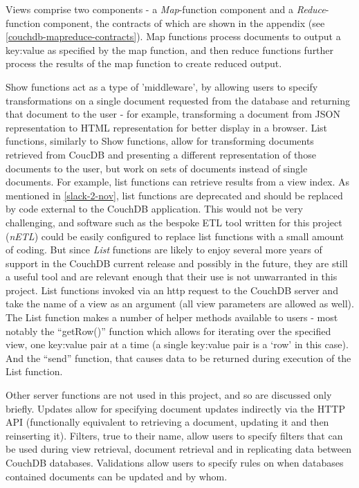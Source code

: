 Views comprise two components - a \textit{Map}-function component and a \textit{Reduce}-function component, the contracts of which are shown in the appendix (see \ref{couchdb-mapreduce-contracts}). Map functions process documents to output a key:value as specified by the map function, and then reduce functions further process the results of the map function to create reduced output.

Show functions act as a type of 'middleware', by allowing users to specify transformations on a single document requested from the database and returning that document to the user - for example, transforming a document from JSON representation to HTML representation for better display in a browser. List functions, similarly to Show functions, allow for transforming documents retrieved from CoucDB and presenting a different representation of those documents to the user, but work on sets of documents instead of single documents. For example, list functions can retrieve results from a view index. As mentioned in \ref{slack-2-nov}, list functions are deprecated and should be replaced by code external to the CouchDB application. This would not be very challenging, and software such as the bespoke ETL tool written for this project (\textit{nETL}) could be easily configured to replace list functions with a small amount of coding. But since \textit{List} functions are likely to enjoy several more years of support in the CouchDB current release and possibly in the future, they are still a useful tool and are relevant enough that their use is not unwarranted in this project. List functions invoked via an http request to the CouchDB server and take the name of a view as an argument (all view parameters are allowed as well). The List function makes a number of helper methods available to users - most notably the ``getRow()'' function which allows for iterating over the specified view, one key:value pair at a time (a single key:value pair is a `row' in this case). And the ``send'' function, that causes data to be returned during execution of the List function.

Other server functions are not used in this project, and so are discussed only briefly. Updates allow for specifying document updates indirectly via the HTTP API (functionally equivalent to retrieving a document, updating it and then reinserting it). Filters, true to their name, allow users to specify filters that can be used during view retrieval, document retrieval and in replicating data between CouchDB databases. Validations allow users to specify rules on when databases contained documents can be updated and by whom.

